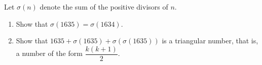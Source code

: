 Let $\sigma(n)$ denote the sum of the positive divisors of $n$.
\begin{enumerate}
\item[(a)] Show that $\sigma(1635)=\sigma(1634)$.
\item[(b)] Show that $1635+\sigma(1635)+\sigma(\sigma(1635))$ is a triangular number, that is, a number of the form $\dfrac{k(k+1)}{2}$.
\end{enumerate}
